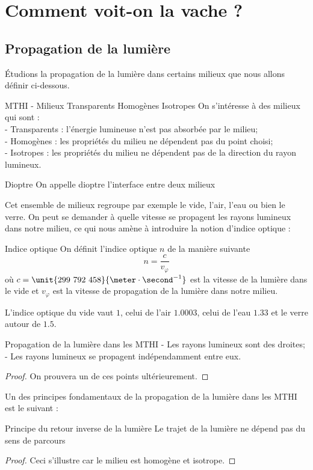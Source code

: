 \documentclass{classe}
\begin{document}
\section{Comment voit-on la vache ?}
\subsection{Propagation de la lumière}
Étudions la propagation de la lumière dans certains milieux que nous allons définir ci-dessous.
\begin{définition}{MTHI - Milieux Transparents Homogènes Isotropes}{}
On s'intéresse à des milieux qui sont :\\
- Transparents : l'énergie lumineuse n'est pas absorbée par le milieu;\\
- Homogènes : les propriétés du milieu ne dépendent pas du point choisi;\\
- Isotropes : les propriétés du milieu ne dépendent pas de la direction du rayon lumineux.
\end{définition}
\begin{définition}{Dioptre}{}
On appelle dioptre l'interface entre deux milieux
\end{définition}
Cet ensemble de milieux regroupe par exemple le vide, l'air, l'eau ou bien le verre. On peut se demander à quelle vitesse se propagent les rayons lumineux dans notre milieu, ce qui nous amène à introduire la notion d'indice optique :
\begin{définition}{Indice optique}{}
On définit l'indice optique $n$ de la manière suivante
\begin{equation*}
	n=\frac{c}{v_\varphi}
\end{equation*}
où $c =\unit{299~792~458}{\meter\cdot\second^{-1}}$ est la vitesse de la lumière dans le vide et $v_\varphi$ est la vitesse de propagation de la lumière dans notre milieu.
\end{définition}
\begin{example}
	L'indice optique du vide vaut $1$, celui de l'air $1.0003$, celui de l'eau $1.33$ et le verre autour de $1.5$.
\end{example}
\begin{théorème}{Propagation de la lumière dans les MTHI}{}
- Les rayons lumineux sont des droites;\\
- Les rayons lumineux se propagent indépendamment entre eux.
\end{théorème}
\begin{proof}
	On prouvera un de ces points ultérieurement.
\end{proof}
Un des principes fondamentaux de la propagation de la lumière dans les MTHI est le suivant :
\begin{théorème}{Principe du retour inverse de la lumière}{}
Le trajet de la lumière ne dépend pas du sens de parcours
\end{théorème}
\begin{proof}
	Ceci s'illustre car le milieu est homogène et isotrope.
\end{proof}
\end{document}
